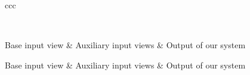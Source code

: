 \newcommand\ColHeadings{Base input view & Auxiliary input views & Output of our system}


\begin{centering}
  \begin{longtable}{ccc}
    \caption{Here we show further examples of scenes inferred by our
      system. In the table below, the left panel shows the base input
      view, the middle panel shows the two auxiliary views used for
      photo--consistency calculations, and the right panel shows the
      MAP scene $\Scene$ inferred by our system.}\\
    \label{table:showcase}

    \ColHeadings
    \endfirsthead

    \ColHeadings
    \endhead

     \\
    \endfoot
    \endlastfoot


\end{longtable}
\end{centering}
